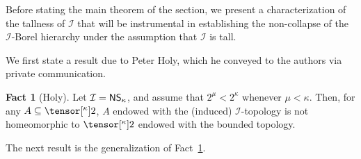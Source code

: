 \documentclass{amsart}
\numberwithin{equation}{section}
\newcommand{\I}{\mathcal{I}}
\newcommand{\pre}[2]{\tensor[^{#1}]{#2}{}}
\newcommand{\1}{\mathbf{I}}
\newcommand{\2}{\mathbf{II}}
\renewcommand{\k}{\kappa}
\theoremstyle{definition}
\newtheorem{fact}[theorem]{Fact}
\theoremstyle{remark}
\begin{document}
Before stating the main theorem of the section, we present a characterization of the tallness of \(\I\) that will be instrumental in establishing the non-collapse of the \(\I\)-Borel hierarchy under the assumption that \(\I\) is tall.

We first state a result due to Peter Holy, which he conveyed to the authors via private communication.


\begin{fact}[Holy]\label{fact:holy}
 Let $\I=\sf{NS_\k}$, and assume that $2^\mu<2^\kappa$ whenever $\mu<\kappa$. Then, for any $A\subseteq\pre{\k}{2}$, \(A\) endowed with the (induced) \(\I\)-topology is not homeomorphic to $\pre{\k}{2}$ endowed with the bounded topology.
\end{fact}

The next result is the generalization of Fact~\ref{fact:holy}. 
\end{document}
